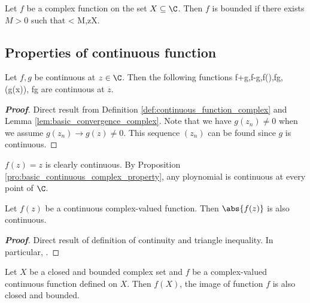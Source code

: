\begin{definition}
Let $f$ be a complex function on the set $X\subseteq \C$. Then $f$ is bounded if there exists $M>0$ such that
\be
{} < M,\qquad z\in X.
\ee
\end{definition}

\subsection{Properties of continuous function}

\begin{proposition}\label{pro:basic_continuous_complex_property}
Let $f,g$ be continuous at $z\in \C$. Then the following functions
\be
f+g,\qquad f-g,\qquad \lm f\quad(\lm\in \C),\qquad fg,\qquad {}\quad(g(x)), \qquad f\circ g
\ee
are continuous at $z$.
\end{proposition}


\begin{proof}[\bf Proof]
Direct result from Definition \ref{def:continuous_function_complex} and Lemma \ref{lem:basic_convergence_complex}. Note that we have $g(z_n)\neq 0$ when we assume $g(z_n) \to g(z)\neq 0$. This sequence $(z_n)$ can be found since $g$ is continuous.
\end{proof}

\begin{example}
$f(z)=z$ is clearly continuous. By Proposition \ref{pro:basic_continuous_complex_property}, any ploynomial is continuous at every point of $\C$.
\end{example}


\begin{proposition}\label{pro:absolute_value_of_continuous_function_complex}
Let $f(z)$ be a continuous complex-valued function. Then $\abs{f(z)}$ is also continuous.
\end{proposition}

\begin{proof}[\bf Proof]
Direct result of definition of continuity and triangle inequality. In particular,
\be
{} \leq {}.
\ee
\end{proof}



\begin{theorem}\label{thm:complex_continuous_function_reserves_boundedness_and_closeness}
Let $X$ be a closed and bounded complex set and $f$ be a complex-valued continuous function defined on $X$. Then $f(X)$, the image of function $f$ is also closed and bounded.
\end{theorem}

